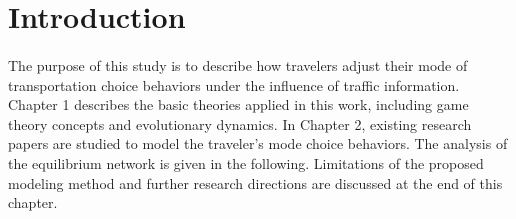 \documentclass[10pt,a4paper]{article}
\begin{document}
\section{Introduction}

\paragraph{}The purpose of this study is to describe how travelers adjust their mode of transportation choice behaviors under the influence of traffic information. Chapter 1 describes the basic theories applied in this work, including game theory concepts and evolutionary dynamics. In Chapter 2, existing research papers are studied to model the traveler's mode choice behaviors. The analysis of the equilibrium network is given in the following. Limitations of the proposed modeling method and further research directions are discussed at the end of this chapter. 
\end{document}
